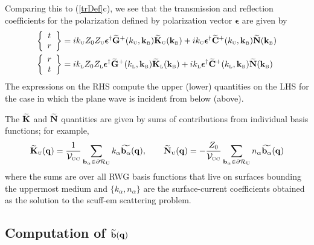 \documentclass[letterpaper]{article}
\newcommand{\vbEps}{\boldsymbol{\epsilon}}
\newcommand{\wt}{\widetilde}
\begin{document}
Comparing this to (\ref{trDef}c), we see that the transmission and
reflection coefficients for the polarization defined by polarization
vector $\vbEps$ are given by 
\begin{align}
 \left\{\begin{array}{c}t \\ r\end{array}\right\}
&=
         ik\subt{U} Z_0 Z\subt{U} 
         \vbEps^\dagger \vb{\wt G}^+(k\subt{U}, \vb k\subt{B})
         \wt{\vb K}\subt{U}(\vb k\subt{B})
        +ik\subt{U} \vbEps^\dagger \vb{\wt C}^+(k\subt{U}, \vb k\subt{B})
         \wt{\vb N}(\vb k\subt{B})
\\
 \left\{\begin{array}{c}r \\ t\end{array}\right\}
&= ik\subt{L} Z_0 Z\subt{L} 
         \vbEps^\dagger \vb{\wt G}^+(k\subt{L}, \vb k\subt{B})
         \wt{\vb K}\subt{L}(\vb k\subt{B})
        +ik\subt{L} \vbEps^\dagger \vb{\wt C}^+(k\subt{L}, \vb k\subt{B})
         \wt{\vb N}(\vb k\subt{B})
\end{align}
The expressions on the RHS compute the upper (lower) quantities
on the LHS for the case in which the plane wave is incident
from below (above).

The $\wt{\vb K}$ and $\wt{\vb N}$ quantities are given by
sums of contributions from individual basis functions; for
example, 
$$
 \wt{\vb K}\subt{U}(\vb q)
  =\frac{1}{\mc V\subt{UC}}
    \sum_{\vb b_\alpha \in \partial \mc R\subt{U}}
     k_\alpha \wt{\vb b_\alpha}(\vb q),
\qquad
 \wt{\vb N}\subt{U}(\vb q)
  =-\frac{Z_0}{\mc V\subt{UC}} \sum_{\vb b_\alpha \in \partial \mc R\subt{U}}
     n_\alpha \wt{\vb b_\alpha}(\vb q)
$$
where the sums are over all RWG basis functions that live on
surfaces bounding the uppermost medium and $\{k_\alpha,n_\alpha\}$
are the surface-current coefficients obtained as the 
solution to the {\sc scuff-em} scattering problem.

\subsection{Computation of $\wt{\vb b}(\vb q)$}
\end{document}
